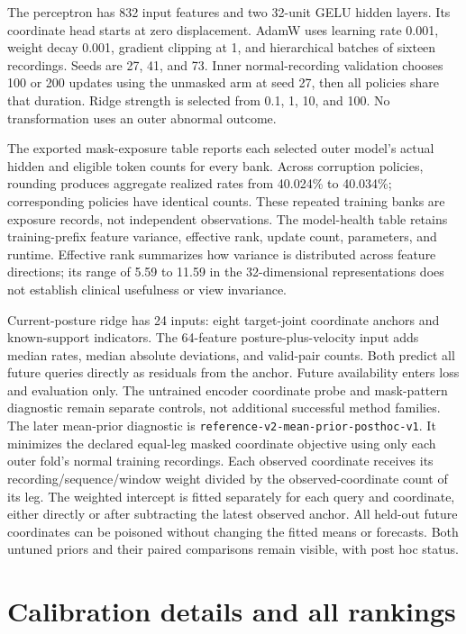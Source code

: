 \documentclass[letterpaper]{article}
\begin{document}
The perceptron has 832 input features and two 32-unit GELU hidden layers. Its coordinate head starts at zero displacement. AdamW uses learning rate 0.001, weight decay 0.001, gradient clipping at 1, and hierarchical batches of sixteen recordings. Seeds are 27, 41, and 73. Inner normal-recording validation chooses 100 or 200 updates using the unmasked arm at seed 27, then all policies share that duration. Ridge strength is selected from 0.1, 1, 10, and 100. No transformation uses an outer abnormal outcome.

The exported mask-exposure table reports each selected outer model's actual hidden and eligible token counts for every bank. Across corruption policies, rounding produces aggregate realized rates from 40.024\% to 40.034\%; corresponding policies have identical counts. These repeated training banks are exposure records, not independent observations. The model-health table retains training-prefix feature variance, effective rank, update count, parameters, and runtime. Effective rank summarizes how variance is distributed across feature directions; its range of 5.59 to 11.59 in the 32-dimensional representations does not establish clinical usefulness or view invariance.

Current-posture ridge has 24 inputs: eight target-joint coordinate anchors and known-support indicators. The 64-feature posture-plus-velocity input adds median rates, median absolute deviations, and valid-pair counts. Both predict all future queries directly as residuals from the anchor. Future availability enters loss and evaluation only. The untrained encoder coordinate probe and mask-pattern diagnostic remain separate controls, not additional successful method families. The later mean-prior diagnostic is \texttt{reference-v2-mean-prior-posthoc-v1}. It minimizes the declared equal-leg masked coordinate objective using only each outer fold's normal training recordings. Each observed coordinate receives its recording/sequence/window weight divided by the observed-coordinate count of its leg. The weighted intercept is fitted separately for each query and coordinate, either directly or after subtracting the latest observed anchor. All held-out future coordinates can be poisoned without changing the fitted means or forecasts. Both untuned priors and their paired comparisons remain visible, with post hoc status.

\section{Calibration details and all rankings}
\end{document}
